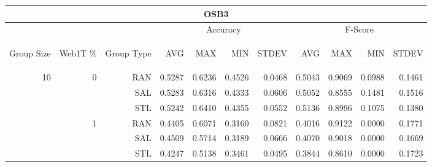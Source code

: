\begin{center}
\begin{table}[htbp] 
 \begin{center}
\begin{tabular}{ | r | r | r | r | r | r | r | r | r | r | r |}
\hline
\multicolumn{11}{|c|}{OSB3}\\
\hline
 & & & \multicolumn{4}{|c|}{Accuracy} & \multicolumn{4}{|c|}{F-Score}\\ \cline{4-11}
\begin{sideways}Group Size\end{sideways} & \begin{sideways}Web1T \%\end{sideways} & \begin{sideways}Group Type\end{sideways} & \begin{sideways}AVG\end{sideways} & \begin{sideways}MAX\end{sideways} & \begin{sideways}MIN\end{sideways} & \begin{sideways}STDEV\end{sideways} & \begin{sideways}AVG\end{sideways} & \begin{sideways}MAX\end{sideways} & \begin{sideways}MIN\end{sideways} & \begin{sideways}STDEV\end{sideways}\\
\hline
\multirow{18}{*}{10}
 & \multirow{3}{*}{0} & RAN & 0.5287 & 0.6236 & 0.4526 & 0.0468 & 0.5043 & 0.9069 & 0.0988 & 0.1461\\ \cline{3-11}
 &   & SAL & 0.5283 & 0.6316 & 0.4333 & 0.0606 & 0.5052 & 0.8555 & 0.1481 & 0.1516\\ \cline{3-11}
 &   & STL & 0.5242 & 0.6410 & 0.4355 & 0.0552 & 0.5136 & 0.8996 & 0.1075 & 0.1380\\ \cline{2-11}
 & \multirow{3}{*}{1} & RAN & 0.4405 & 0.6071 & 0.3160 & 0.0821 & 0.4016 & 0.9122 & 0.0000 & 0.1771\\ \cline{3-11}
 &   & SAL & 0.4509 & 0.5714 & 0.3189 & 0.0666 & 0.4070 & 0.9018 & 0.0000 & 0.1669\\ \cline{3-11}
 &   & STL & 0.4247 & 0.5138 & 0.3461 & 0.0495 & 0.3844 & 0.8610 & 0.0000 & 0.1723\\ \cline{2-11}

\end{tabular}
\end{center}
\end{table}
\end{center}
